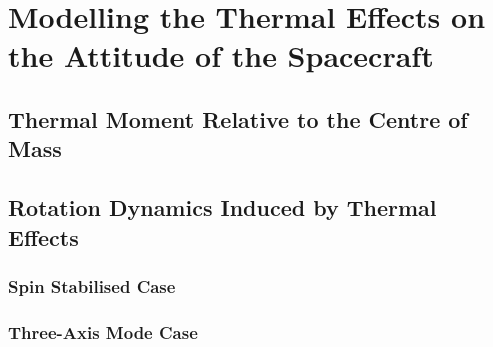%
%
%


\chapter{Modelling the Thermal Effects on the Attitude of the Spacecraft}
\label{chp:Thermal_attitude}



\section{Thermal Moment Relative to the Centre of Mass}
\label{subsec:thermal_moment}

 {\small\textit{\lipsum[1-2]}}



\section{Rotation Dynamics Induced by Thermal Effects}
\label{subsec:thermal_rotation}

 {\small\textit{\lipsum[1-2]}}




\subsection{Spin Stabilised Case}
\label{subsec:spinsatibised_case}

 {\small\textit{\lipsum[1-2]}}



\subsection{Three-Axis Mode Case}
\label{subsec:threeaxis_case}

 {\small\textit{\lipsum[1-2]}}





